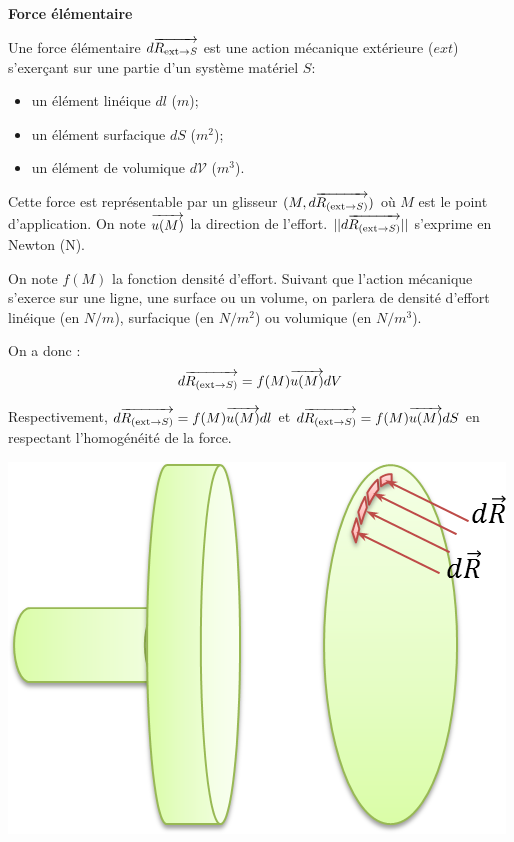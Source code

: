 \documentclass[10pt]{article}
\begin{document}
\begin{defi}
\begin{minipage}[c]{.65\linewidth}
\textbf{Force élémentaire}

Une force élémentaire $d\overrightarrow{R_{\text{ext}\rightarrow S}}$ est une action mécanique extérieure ($ext$) s'exerçant sur une partie d'un système matériel $S$:
\begin{itemize}
\item un élément linéique $dl$ ($m$);
\item un élément surfacique $dS$ ($m^2$);
\item un élément de volumique $d\mathcal{V}$ ($m^3$).
\end{itemize} 
Cette force est représentable par un glisseur $(M,d\overrightarrow{R_{(\text{ext}\rightarrow S)}})$ où $M$ est le point d'application. On note $\overrightarrow{u(M)}$ la direction de l'effort. $||d\overrightarrow{R_{(\text{ext}\rightarrow S)}}||$ s'exprime en Newton (N).

On note $f(M)$ la fonction densité d'effort. Suivant que l'action mécanique s'exerce sur une ligne, une surface ou un volume, on parlera de densité d'effort linéique (en $N/m$), surfacique (en $N/m^2$) ou volumique (en $N/m^3$).

On a donc :
$$
d\overrightarrow{R_{(\text{ext}\rightarrow S)}} = f(M) \overrightarrow{u(M)} dV 
$$

Respectivement, $d\overrightarrow{R_{(\text{ext}\rightarrow S)}} = f(M) \overrightarrow{u(M)} dl $ et $d\overrightarrow{R_{(\text{ext}\rightarrow S)}} = f(M) \overrightarrow{u(M)} dS $ en respectant l'homogénéité de la force.
\end{minipage}\hfill
\begin{minipage}[c]{.3\linewidth}
\begin{center}
\includegraphics[width=.95\textwidth]{images/local}
\end{center}
\end{minipage}
\end{defi}
\end{document}
